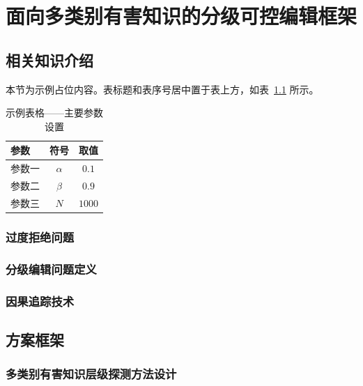 \chapter{面向多类别有害知识的分级可控编辑框架}\label{chap:experiment}

\section{相关知识介绍}
本节为示例占位内容。表标题和表序号居中置于表上方，如表~\ref{tab:params} 所示。

\begin{table}[htbp]
  \centering
  \caption{示例表格——主要参数设置}
  \label{tab:params}
  \begin{tabular}{lcc}
    \toprule
    参数 & 符号 & 取值 \\
    \midrule
    参数一 & $\alpha$ & $0.1$ \\
    参数二 & $\beta$  & $0.9$ \\
    参数三 & $N$      & $1000$ \\
    \bottomrule
  \end{tabular}
\end{table}

\subsection{过度拒绝问题}

\subsection{分级编辑问题定义}

\subsection{因果追踪技术}

\section{方案框架}

\subsection{多类别有害知识层级探测方法设计}

